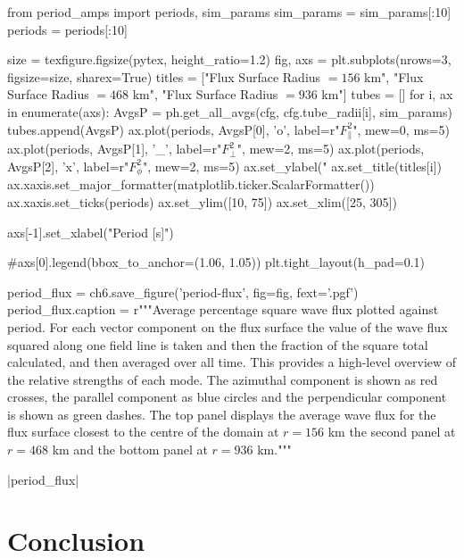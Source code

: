 \begin{pycode}[chapter6]

from period_amps import periods, sim_params
sim_params = sim_params[:10]
periods = periods[:10]

size = texfigure.figsize(pytex, height_ratio=1.2)
fig, axs = plt.subplots(nrows=3, figsize=size, sharex=True)
titles = ["Flux Surface Radius $=156$ km", "Flux Surface Radius $=468$ km", "Flux Surface Radius $=936$ km"]
tubes = []
for i, ax in enumerate(axs):
    AvgsP = ph.get_all_avgs(cfg, cfg.tube_radii[i], sim_params)
    tubes.append(AvgsP)
    ax.plot(periods, AvgsP[0], 'o', label=r"$F_\parallel^2$", mew=0, ms=5)
    ax.plot(periods, AvgsP[1], '_', label=r"$F_\perp^2$", mew=2, ms=5)
    ax.plot(periods, AvgsP[2], 'x', label=r"$F_\phi^2$", mew=2, ms=5)
    ax.set_ylabel("%
    ax.set_title(titles[i])
    ax.xaxis.set_major_formatter(matplotlib.ticker.ScalarFormatter())
    ax.xaxis.set_ticks(periods)
    ax.set_ylim([10, 75])
    ax.set_xlim([25, 305])

axs[-1].set_xlabel("Period [s]")

#axs[0].legend(bbox_to_anchor=(1.06, 1.05))
plt.tight_layout(h_pad=0.1)

period_flux = ch6.save_figure('period-flux', fig=fig, fext='.pgf')
period_flux.caption = r"""Average percentage square wave flux plotted against period. For each vector component on the flux surface the value of the wave flux squared along one field line is taken and then the fraction of the square total calculated, and then averaged over all time. This provides a high-level overview of the relative strengths of each mode. The azimuthal component is shown as red crosses, the parallel component as blue circles and the perpendicular component is shown as green dashes. The top panel displays the average wave flux for the flux surface closest to the centre of the domain at $r=156$ km the second panel at $r=468$ km and the bottom panel at $r=936$ km."""

\end{pycode}

\py[chapter6]|period_flux|

\section{Conclusion}\label{sec:conclusion}